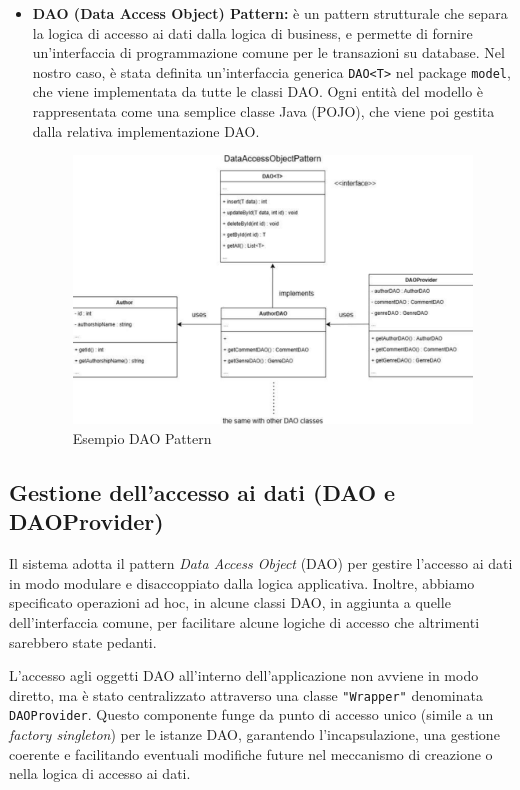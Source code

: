 \documentclass[a4paper]{article}
\begin{document}
\begin{itemize}
    \item \textbf{DAO (Data Access Object) Pattern:} è un pattern strutturale che separa la logica di accesso ai dati dalla logica di business, e permette di fornire un'interfaccia di programmazione comune per le transazioni su database. Nel nostro caso, è stata definita un’interfaccia generica \texttt{DAO<T>} nel package \texttt{model}, che viene implementata da tutte le classi DAO. Ogni entità del modello è rappresentata come una semplice classe Java (POJO), che viene poi gestita dalla relativa implementazione DAO.

    \begin{figure}[H]
        \centering
        \includegraphics[width=0.8 \textwidth]{./figures/DAO_Pattern}
        \caption{Esempio DAO Pattern}
        \label{fig:DAO_Pattern}
    \end{figure}
\end{itemize}

\subsection{Gestione dell’accesso ai dati (DAO e DAOProvider)}
Il sistema adotta il pattern \textit{Data Access Object} (DAO) per gestire l’accesso ai dati in modo modulare e disaccoppiato dalla logica applicativa. Inoltre, abbiamo specificato operazioni ad hoc, in alcune classi DAO, in aggiunta a quelle dell'interfaccia comune, per facilitare alcune logiche di accesso che altrimenti sarebbero state pedanti.

L’accesso agli oggetti DAO all’interno dell’applicazione non avviene in modo diretto, ma è stato centralizzato attraverso una classe \texttt{"Wrapper"} denominata \texttt{DAOProvider}. Questo componente funge da punto di accesso unico (simile a un \textit{factory singleton}) per le istanze DAO, garantendo l'incapsulazione, una gestione coerente e facilitando eventuali modifiche future nel meccanismo di creazione o nella logica di accesso ai dati.
\end{document}
